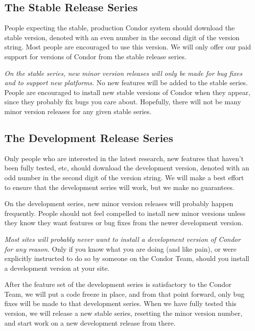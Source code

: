 \subsection{\label{sec:Stable-Series}The Stable Release Series}

People expecting the stable, production Condor system should download
the stable version, denoted with an even number in the second digit of
the version string.
Most people are encouraged to use this version.  
We will only offer our paid support for versions of Condor from the
stable release series.

\emph{On the stable series, new minor version releases will only
be made for bug fixes and to support new platforms.}
No new features will be added to the stable series.
People are encouraged to install new stable versions of Condor when
they appear, since they probably fix bugs you care about.
Hopefully, there will not be many minor version releases for any given
stable series.


\subsection{\label{sec:Developement-Series}
The Development Release Series}

Only people who are interested in the latest research, new features
that haven't been fully tested, etc, should download the development
version, denoted with an odd number in the second digit of the version
string.  
We will make a best effort to ensure that the development series will
work, but we make no guarantees.

On the development series, new minor version releases will probably
happen frequently.
People should not feel compelled to install new minor versions unless
they know they want features or bug fixes from the newer development
version.

\emph{Most sites will probably never want to install a development
version of Condor for any reason.}
Only if you know what you are doing (and like pain), or were
explicitly instructed to do so by someone on the Condor Team, should
you install a development version at your site.

After the feature set of the development series is satisfactory to the
Condor Team, we will put a code freeze in place, and from that point
forward, only bug fixes will be made to that development series.
When we have fully tested this version, we will release a new stable
series, resetting the minor version number, and start work on a new
development release from there.

